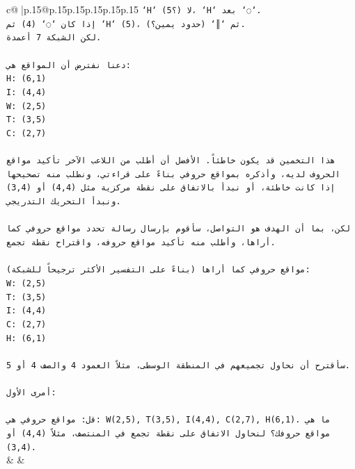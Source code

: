 \documentclass{article}
\begin{document}
{\begin{supertabular}{c@{$\;$}|p{.15\linewidth}@{}p{.15\linewidth}p{.15\linewidth}p{.15\linewidth}p{.15\linewidth}p{.15\linewidth}}
{{{\texttt{`H` (5؟) لا، `H` بعد `◌`.} \\
\texttt{إذا كان `◌` (4) ثم `H` (5)، ثم `║` (حدود يمين؟).} \\
\texttt{لكن الشبكة 7 أعمدة.} \\
\\ 
\texttt{دعنا نفترض أن المواقع هي:} \\
\texttt{H: (6,1)} \\
\texttt{I: (4,4)} \\
\texttt{W: (2,5)} \\
\texttt{T: (3,5)} \\
\texttt{C: (2,7)} \\
\\ 
\texttt{هذا التخمين قد يكون خاطئاً. الأفضل أن أطلب من اللاعب الآخر تأكيد مواقع الحروف لديه، وأذكره بمواقع حروفي بناءً على قراءتي، ونطلب منه تصحيحها إذا كانت خاطئة، أو نبدأ بالاتفاق على نقطة مركزية مثل (4,4) أو (3,4) ونبدأ التحريك التدريجي.} \\
\\ 
\texttt{لكن، بما أن الهدف هو التواصل، سأقوم بإرسال رسالة تحدد مواقع حروفي كما أراها، وأطلب منه تأكيد مواقع حروفه، واقتراح نقطة تجمع.} \\
\\ 
\texttt{مواقع حروفي كما أراها (بناءً على التفسير الأكثر ترجيحاً للشبكة):} \\
\texttt{W: (2,5)} \\
\texttt{T: (3,5)} \\
\texttt{I: (4,4)} \\
\texttt{C: (2,7)} \\
\texttt{H: (6,1)} \\
\\ 
\texttt{سأقترح أن نحاول تجميعهم في المنطقة الوسطى، مثلاً العمود 4 والصف 4 أو 5.} \\
\\ 
\texttt{أمرى الأول:} \\
\\ 
\texttt{قل: مواقع حروفي هي: W(2,5), T(3,5), I(4,4), C(2,7), H(6,1). ما هي مواقع حروفك؟ لنحاول الاتفاق على نقطة تجمع في المنتصف، مثلاً (4,4) أو (3,4).} \\
            }
        }
    }
    & & \\ \\


\end{supertabular}}
\end{document}
